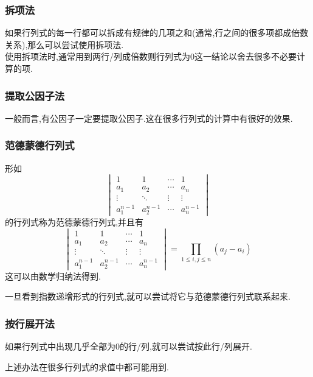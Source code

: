 \documentclass{ctexart}
\begin{document}
\subsubsection{拆项法}
\begin{hint}
    如果行列式的每一行都可以拆成有规律的几项之和(通常,行之间的很多项都成倍数关系),那么可以尝试使用拆项法.\\
    使用拆项法时,通常用到两行/列成倍数则行列式为$0$这一结论以舍去很多不必要计算的项.
\end{hint}
\subsubsection{提取公因子法}
\begin{hint}
    一般而言,有公因子一定要提取公因子.这在很多行列式的计算中有很好的效果.
\end{hint}
\subsubsection{范德蒙德行列式}
\begin{theorem}[范德蒙德行列式]
    形如
    \[\begin{vmatrix}
        1&1&\cdots&1\\
        a_1&a_2&\cdots&a_n\\
        \vdots&\ddots&\vdots&\vdots\\
        a_1^{n-1}&a_2^{n-1}&\cdots&a_{n}^{n-1}
    \end{vmatrix}\]
    的行列式称为范德蒙德行列式,并且有
    \[\begin{vmatrix}
        1&1&\cdots&1\\
        a_1&a_2&\cdots&a_n\\
        \vdots&\ddots&\vdots&\vdots\\
        a_1^{n-1}&a_2^{n-1}&\cdots&a_{n}^{n-1}
    \end{vmatrix}=\prod_{1\leq i,j\leq n}\left(a_j-a_i\right)\]
    这可以由数学归纳法得到.
\end{theorem}
\begin{hint}
    一旦看到指数递增形式的行列式,就可以尝试将它与范德蒙德行列式联系起来.
\end{hint}
\subsubsection{按行展开法}
\begin{hint}
    如果行列式中出现几乎全部为$0$的行/列,就可以尝试按此行/列展开.
\end{hint}
上述办法在很多行列式的求值中都可能用到.
\end{document}
